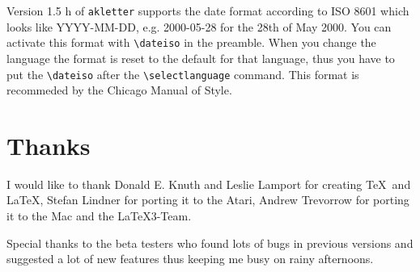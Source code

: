 \documentclass[a4paper]{article}
\begin{document}
Version 1.5 h of \texttt{akletter} supports the date format according 
to ISO 8601 which looks like YYYY-MM-DD, e.g. 2000-05-28 for the 28th 
of May 2000. You can activate this format with \verb+\dateiso+ in the 
preamble. When you change the language the format is reset to the 
default for that language, thus you have to put the \verb+\dateiso+ 
after the \verb+\selectlanguage+ command. This format is recommeded 
by the Chicago Manual of Style.

\section{Thanks}

I would like to thank Donald E. Knuth and Leslie Lamport for creating 
\TeX\ and \LaTeX, Stefan Lindner for porting it to the Atari, Andrew 
Trevorrow for porting it to the Mac and the \LaTeX3-Team.

Special thanks to the beta testers who found lots of bugs in previous 
versions and suggested a lot of new features thus keeping me busy on 
rainy afternoons.
\end{document}
